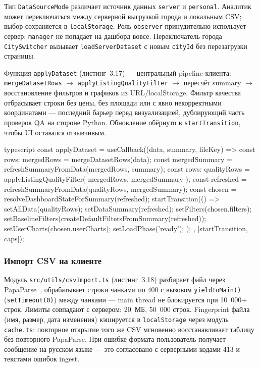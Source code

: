 Тип \texttt{DataSourceMode} различает источник данных \texttt{server} и \texttt{personal}. Аналитик может переключаться между серверной выгрузкой города и локальным CSV; выбор сохраняется в \texttt{localStorage}. Роль \texttt{observer} принудительно использует сервер; \texttt{manager} не попадает на дашборд вовсе. Переключатель города \texttt{CitySwitcher} вызывает \texttt{loadServerDataset} с новым \texttt{cityId} без перезагрузки страницы.

Функция \texttt{applyDataset} (листинг~3.17) --- центральный pipeline клиента: \texttt{mergeDatasetRows} $\rightarrow$ \texttt{applyListingQualityFilter} $\rightarrow$ пересчёт summary $\rightarrow$ восстановление фильтров и графиков из URL/localStorage. Фильтр качества отбрасывает строки без цены, без площади или с явно некорректными координатами --- последний барьер перед визуализацией, дублирующий часть проверок QA на стороне Python. Обновление обёрнуто в \texttt{startTransition}, чтобы UI оставался отзывчивым.

\begin{singleminted}{typescript}
const applyDataset = useCallback((data, summary, fileKey) => {
    const { rows: mergedRows } = mergeDatasetRows(data);
    const mergedSummary = refreshSummaryFromData(mergedRows, summary);
    const { rows: qualityRows } = applyListingQualityFilter(
        mergedRows, mergedSummary
    );
    const refreshed = refreshSummaryFromData(qualityRows, mergedSummary);
    const chosen = resolveDashboardStateForSummary(refreshed);
    startTransition(() => {
        setAllData(qualityRows);
        setDataSummary(refreshed);
        setFilters(chosen.filters);
        setBaselineFilters(createDefaultFiltersFromSummary(refreshed));
        setUserCharts(chosen.userCharts);
        setLoadPhase('ready');
    });
}, [startTransition, caps]);
\end{singleminted}
\label{lst:apply-dataset}

\subsubsection{Импорт CSV на клиенте}

Модуль \texttt{src/utils/csvImport.ts} (листинг~3.18) разбирает файл через PapaParse~\cite{papaparse}, обрабатывает строки чанками по 400 с вызовом \texttt{yieldToMain()} (\texttt{setTimeout(0)}) между чанками --- main thread не блокируется при 10~000+ строк. Лимиты совпадают с сервером: 20~МБ, 50~000 строк. Fingerprint файла (имя, размер, дата изменения) кэшируется в \texttt{localStorage} через модуль \texttt{cache.ts}: повторное открытие того же CSV мгновенно восстанавливает таблицу без повторного PapaParse. При ошибке формата пользователь получает сообщение на русском языке --- это согласовано с серверными кодами 413 и текстами ошибок ingest.

